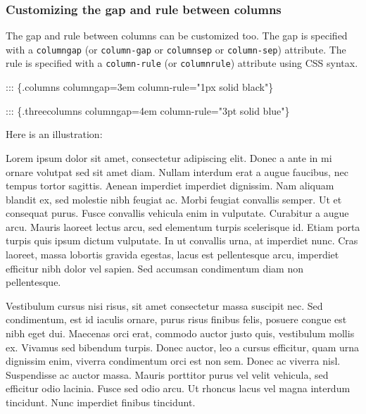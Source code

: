 \documentclass[
]{article}
\newenvironment{Shaded}{}{}
\newcommand{\NormalTok}[1]{#1}
\begin{document}
\hypertarget{customizing-the-gap-and-rule-between-columns}{%
\subsubsection{Customizing the gap and rule between
columns}\label{customizing-the-gap-and-rule-between-columns}}

The gap and rule between columns can be customized too. The gap is
specified with a \texttt{columngap} (or \texttt{column-gap} or
\texttt{columnsep} or \texttt{column-sep}) attribute. The rule is
specified with a \texttt{column-rule} (or \texttt{columnrule}) attribute
using CSS syntax.

\begin{Shaded}
\begin{Highlighting}[]
\NormalTok{::: \{.columns columngap=3em column{-}rule="1px solid black"\}}

\NormalTok{::: \{.threecolumns columngap=4em column{-}rule="3pt solid blue"\}}
\end{Highlighting}
\end{Shaded}

Here is an illustration:

{\setlength{\columnsep}{4em}
\setlength{\columnseprule}{ 3pt}
\renewcommand{\columnseprulecolor}{\color{blue}}
\begin{multicols}{3}

Lorem ipsum dolor sit amet, consectetur adipiscing elit. Donec a ante in
mi ornare volutpat sed sit amet diam. Nullam interdum erat a augue
faucibus, nec tempus tortor sagittis. Aenean imperdiet imperdiet
dignissim. Nam aliquam blandit ex, sed molestie nibh feugiat ac. Morbi
feugiat convallis semper. Ut et consequat purus. Fusce convallis
vehicula enim in vulputate. Curabitur a augue arcu. Mauris laoreet
lectus arcu, sed elementum turpis scelerisque id. Etiam porta turpis
quis ipsum dictum vulputate. In ut convallis urna, at imperdiet nunc.
Cras laoreet, massa lobortis gravida egestas, lacus est pellentesque
arcu, imperdiet efficitur nibh dolor vel sapien. Sed accumsan
condimentum diam non pellentesque.

Vestibulum cursus nisi risus, sit amet consectetur massa suscipit nec.
Sed condimentum, est id iaculis ornare, purus risus finibus felis,
posuere congue est nibh eget dui. Maecenas orci erat, commodo auctor
justo quis, vestibulum mollis ex. Vivamus sed bibendum turpis. Donec
auctor, leo a cursus efficitur, quam urna dignissim enim, viverra
condimentum orci est non sem. Donec ac viverra nisl. Suspendisse ac
auctor massa. Mauris porttitor purus vel velit vehicula, sed efficitur
odio lacinia. Fusce sed odio arcu. Ut rhoncus lacus vel magna interdum
tincidunt. Nunc imperdiet finibus tincidunt.

\end{multicols}
}
\end{document}

